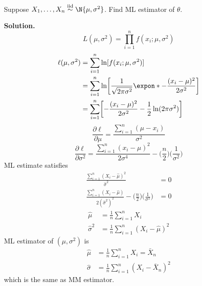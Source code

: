 \begin{Example}{}{}
    Suppose $ X_1,\ldots,X_n\stackrel{\text{iid}}{\sim}\N{\mu,\sigma^2} $.
    Find ML estimator of $ \theta $.

    \textbf{Solution.}
    \[ L(\mu,\sigma^2)=\prod_{i=1}^n f(x_i;\mu,\sigma^2) \]
    \begin{align*}
        \ell(\mu,\sigma^2)
         & =\sum_{i=1}^{n}\ln[f(x_i;\mu,\sigma^2)]                  \\
         & =\sum_{i=1}^{n} \ln\biggl[\frac{1}{\sqrt{2\pi \sigma^2}}
        \expon*{-\frac{(x_i-\mu)^2}{2\sigma^2}} \biggr]             \\
         & =\sum_{i=1}^{n}
        \biggl[-\frac{(x_i-\mu)^2}{2\sigma^2}-
            \frac{1}{2} \ln(2\pi\sigma^2) \biggr]
    \end{align*}
    \[ \frac{\partial\ell}{\partial\mu}=
        \frac{\sum_{i=1}^{n} (\mu-x_i)}{\sigma^2}   \]
    \[ \frac{\partial\ell}{\partial \sigma^2}=
        \frac{\sum_{i=1}^{n} (x_i-\mu)^2}{2\sigma^4}-
        \biggl(\frac{n}{2}\biggr)\biggl(\frac{1}{\sigma^2} \biggr)   \]
    ML estimate satisfies
    \begin{align*}
        \frac{\sum_{i=1}^{n} (X_i-\hat{\mu})^2}{\hat{\sigma}^2}    & =0 \\
        \frac{\sum_{i=1}^{n} (X_i-\hat{\mu})}{2(\hat{\sigma}^2)^2}-
        \biggl(\frac{n}{2}\biggr)\biggl(\frac{1}{\sigma^2} \biggr) & =0
    \end{align*}
    \begin{align*}
        \hat{\mu}      & =\frac{1}{n} \sum_{i=1}^{n} X_i               \\
        \hat{\sigma}^2 & =\frac{1}{n} \sum_{i=1}^{n} (X_i-\hat{\mu})^2
    \end{align*}
    ML estimator of $ (\mu,\sigma^2) $ is
    \begin{align*}
        \hat{\mu}    & =\frac{1}{n} \sum_{i=1}^{n}X_i=\bar{X}_n     \\
        \hat{\sigma} & =\frac{1}{n}\sum_{i=1}^{n} (X_i-\bar{X}_n)^2
    \end{align*}
    which is the same as MM estimator.
\end{Example}

